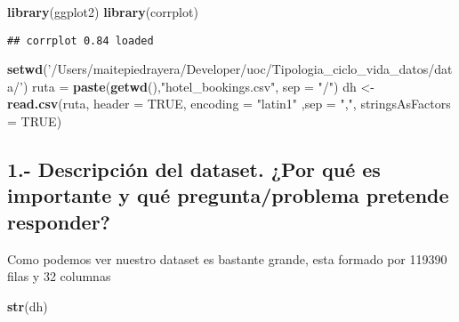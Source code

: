 \documentclass[]{article}
\newenvironment{Shaded}{\begin{snugshade}}{\end{snugshade}}
\newcommand{\DataTypeTok}[1]{\textcolor[rgb]{0.13,0.29,0.53}{#1}}
\newcommand{\KeywordTok}[1]{\textcolor[rgb]{0.13,0.29,0.53}{\textbf{#1}}}
\newcommand{\NormalTok}[1]{#1}
\newcommand{\OtherTok}[1]{\textcolor[rgb]{0.56,0.35,0.01}{#1}}
\newcommand{\StringTok}[1]{\textcolor[rgb]{0.31,0.60,0.02}{#1}}
\begin{document}
\begin{Shaded}
\begin{Highlighting}[]
\KeywordTok{library}\NormalTok{(ggplot2)}
\KeywordTok{library}\NormalTok{(corrplot)}
\end{Highlighting}
\end{Shaded}

\begin{verbatim}
## corrplot 0.84 loaded
\end{verbatim}

\begin{Shaded}
\begin{Highlighting}[]
\KeywordTok{setwd}\NormalTok{(}\StringTok{'/Users/maitepiedrayera/Developer/uoc/Tipologia_ciclo_vida_datos/data/'}\NormalTok{)}
\NormalTok{ruta =}\StringTok{ }\KeywordTok{paste}\NormalTok{(}\KeywordTok{getwd}\NormalTok{(),}\StringTok{"hotel_bookings.csv"}\NormalTok{, }\DataTypeTok{sep =} \StringTok{"/"}\NormalTok{)}
\NormalTok{dh <-}\StringTok{ }\KeywordTok{read.csv}\NormalTok{(ruta, }\DataTypeTok{header =} \OtherTok{TRUE}\NormalTok{, }\DataTypeTok{encoding =} \StringTok{"latin1"}\NormalTok{ ,}\DataTypeTok{sep =} \StringTok{","}\NormalTok{, }\DataTypeTok{stringsAsFactors =} \OtherTok{TRUE}\NormalTok{)}
\end{Highlighting}
\end{Shaded}

\hypertarget{descripciuxf3n-del-dataset.-por-quuxe9-es-importante-y-quuxe9-preguntaproblema-pretende-responder}{%
\subsection{1.- Descripción del dataset. ¿Por qué es importante y qué
pregunta/problema pretende
responder?}\label{descripciuxf3n-del-dataset.-por-quuxe9-es-importante-y-quuxe9-preguntaproblema-pretende-responder}}

Como podemos ver nuestro dataset es bastante grande, esta formado por
119390 filas y 32 columnas

\begin{Shaded}
\begin{Highlighting}[]
\KeywordTok{str}\NormalTok{(dh)}
\end{Highlighting}
\end{Shaded}
\end{document}
